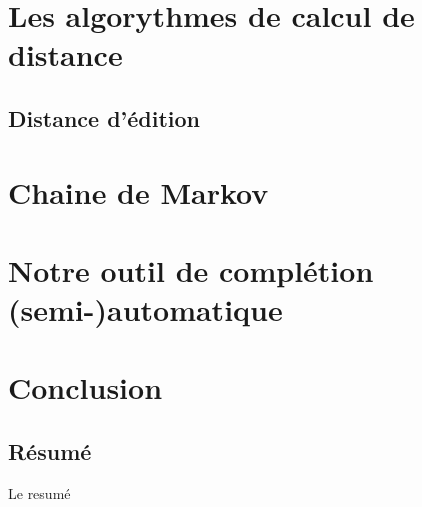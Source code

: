 \documentclass[a4paper, 11pt]{report}
\begin{document}
\chapter{Les algorythmes de calcul de distance}

\section{Distance d'édition}

\chapter{Chaine de Markov}

\chapter{Notre outil de complétion (semi-)automatique}

\chapter*{Conclusion}
\newpage
\begin{center}
    \vspace*{\fill} %
    \section*{Résumé}
    \begin{justify}
Le resumé
    \end{justify}
\end{center}
\end{document}

